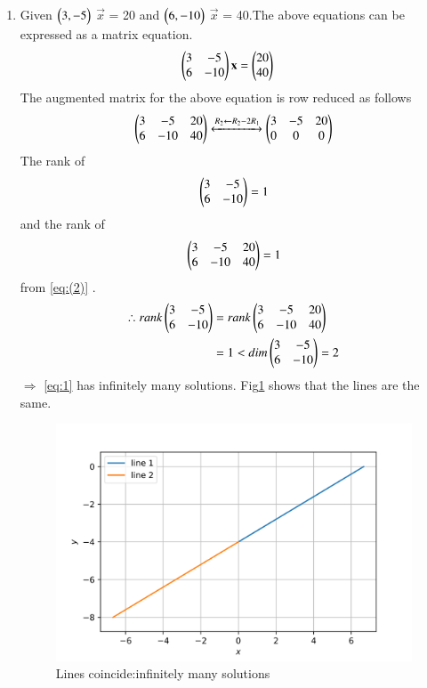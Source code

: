 \documentclass[journal,12pt,twocolumn]{IEEEtran}
\begin{document}
\begin{enumerate}
    \item Given $\begin{pmatrix}3, -5\end{pmatrix}$ $\vec{x}$ = 20 and $\begin{pmatrix}6,-10\end{pmatrix}$ $\vec{x}$ = 40.The above equations can be expressed as a matrix equation.
    \begin{align}
\label{eq:1}
  \begin{pmatrix}3&-5\\6&-10\end{pmatrix}\mathbf{x} &= \begin{pmatrix}20\\40\end{pmatrix}
\end{align}
The augmented matrix for the above equation
is row reduced as follows
\begin{align}
    \begin{pmatrix}3&-5&20\\6&-10&40\end{pmatrix}\xleftrightarrow{R_2\leftarrow R_2 -2R_1}\begin{pmatrix}3&-5&20\\0&0&0\end{pmatrix} \label{eq:(2)}
\end{align}
The rank of\begin{equation} 
\begin{pmatrix}3&-5\\6&-10\end{pmatrix} = 1
\end{equation} and the rank of
\begin{equation} 
\begin{pmatrix}3&-5&20\\6&-10&40\end{pmatrix} = 1
\end{equation}from \ref{eq:(2)} .
\begin{align}
    \therefore rank \begin{pmatrix}3&-5\\6&-10\end{pmatrix} &= rank\begin{pmatrix}3&-5&20\\6&-10&40\end{pmatrix}\\
    &=1 < dim\begin{pmatrix}3&-5\\6&-10\end{pmatrix}=2
\end{align}
$\Longrightarrow$ \ref{eq:1} has infinitely many solutions.
Fig\ref{fig:1} shows that the lines are the same.
\begin{figure}[ht] 
    \includegraphics[width= \columnwidth]{assignment2c-1.png}
    \caption{Lines coincide:infinitely many solutions}
    \label{fig:1}
\end{figure}



\end{enumerate}
\end{document}
